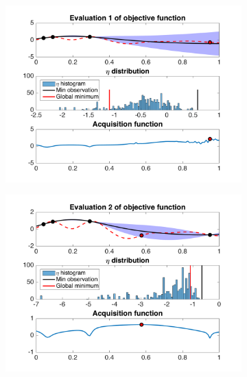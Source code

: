 \documentclass[a4paper,11pt]{report}
\begin{document}
\\
\begin{figure} [p]
\label{1DESBOPA}
	\begin{subfigure}{.5\textwidth}
		  \centering
		  \includegraphics[width=1\linewidth]{ESBOPA_update_eta_prior_seed6_1.png}
	\end{subfigure}
	\begin{subfigure}{.5\textwidth}
 		 \centering
 		 \includegraphics[width=1\linewidth]{ESBOPA_update_eta_prior_seed6_2.png}
	\end{subfigure}	
	\begin{subfigure}{.5\textwidth}

\end{subfigure}
\end{figure}
\end{document}
